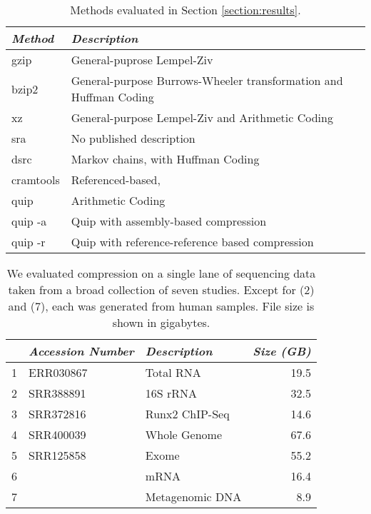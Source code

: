 \documentclass[twocolumn]{article}
\begin{document}
\begin{table}
\begin{tabular}{ll}
\textit{Method} & \textit{Description} \\ \hline
gzip            & General-puprose Lempel-Ziv \\
bzip2           &
\begin{minipage}{0.3\textwidth}
General-purpose Burrows-Wheeler transformation and Huffman Coding
\end{minipage} \\
xz              &
\begin{minipage}{0.3\textwidth}
General-purpose Lempel-Ziv and Arithmetic Coding
\end{minipage} \\
sra             & No published description \\
dsrc & Markov chains,  with Huffman Coding \\
cramtools       & Referenced-based, \\
quip            & Arithmetic Coding \\
quip -a         & Quip with assembly-based compression \\
quip -r         &
\begin{minipage}{0.3\textwidth}
Quip with reference-reference based compression
\end{minipage} \\
\end{tabular}
\caption{Methods evaluated in Section \ref{section:results}.}
\label{tab:methods}
\end{table}


\begin{table}
\begin{tabular}{rllr}
  & \textit{Accession Number} & \textit{Description} & \textit{Size (GB)} \\ \hline
1 & ERR030867                 & Total RNA            & 19.5 \\
2 & SRR388891                 & 16S rRNA             & 32.5 \\
3 & SRR372816                 & Runx2 ChIP-Seq       & 14.6 \\
4 & SRR400039                 & Whole Genome         & 67.6 \\
5 & SRR125858                 & Exome                & 55.2 \\
6 &                           & mRNA                 & 16.4 \\
7 &                           & Metagenomic DNA      &  8.9 \\
\end{tabular}
\caption{We evaluated compression on a single lane of sequencing data taken from a broad
collection of seven studies. Except for (2) and (7), each was generated from human samples.
File size is shown in gigabytes.}
\label{tab:datasets}
\end{table}
\end{document}

